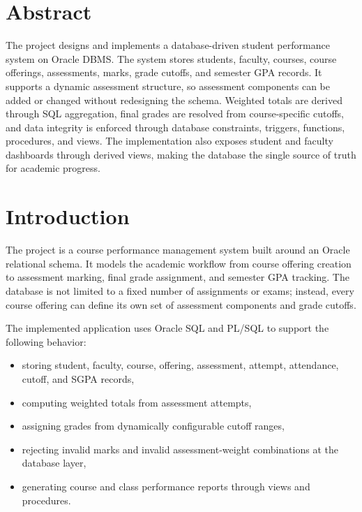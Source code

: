 \documentclass[12pt,a4paper]{report}
\begin{document}
\chapter*{Abstract}
The project designs and implements a database-driven student performance system on Oracle DBMS. The system stores students, faculty, courses, course offerings, assessments, marks, grade cutoffs, and semester GPA records. It supports a dynamic assessment structure, so assessment components can be added or changed without redesigning the schema. Weighted totals are derived through SQL aggregation, final grades are resolved from course-specific cutoffs, and data integrity is enforced through database constraints, triggers, functions, procedures, and views. The implementation also exposes student and faculty dashboards through derived views, making the database the single source of truth for academic progress.

\tableofcontents
\listoftables
\clearpage


\chapter{Introduction}
The project is a course performance management system built around an Oracle relational schema. It models the academic workflow from course offering creation to assessment marking, final grade assignment, and semester GPA tracking. The database is not limited to a fixed number of assignments or exams; instead, every course offering can define its own set of assessment components and grade cutoffs.

The implemented application uses Oracle SQL and PL/SQL to support the following behavior:
\begin{itemize}[leftmargin=1.5em]
  \item storing student, faculty, course, offering, assessment, attempt, attendance, cutoff, and SGPA records,
  \item computing weighted totals from assessment attempts,
  \item assigning grades from dynamically configurable cutoff ranges,
  \item rejecting invalid marks and invalid assessment-weight combinations at the database layer,
  \item generating course and class performance reports through views and procedures.
\end{itemize}
\end{document}
